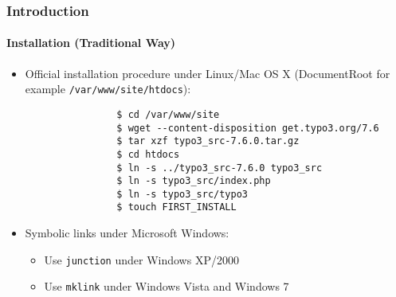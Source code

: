 \begin{frame}[fragile]
	\frametitle{Introduction}
	\framesubtitle{Installation (Traditional Way)}

	\begin{itemize}
		\item Official installation procedure under Linux/Mac OS X\newline
			(DocumentRoot for example \texttt{/var/www/site/htdocs}):

			\begin{lstlisting}
				$ cd /var/www/site
				$ wget --content-disposition get.typo3.org/7.6
				$ tar xzf typo3_src-7.6.0.tar.gz
				$ cd htdocs
				$ ln -s ../typo3_src-7.6.0 typo3_src
				$ ln -s typo3_src/index.php
				$ ln -s typo3_src/typo3
				$ touch FIRST_INSTALL
			\end{lstlisting}

		\item Symbolic links under Microsoft Windows:

			\begin{itemize}
				\item Use \texttt{junction} under Windows XP/2000
				\item Use \texttt{mklink} under Windows Vista and Windows 7
			\end{itemize}

	\end{itemize}
\end{frame}

